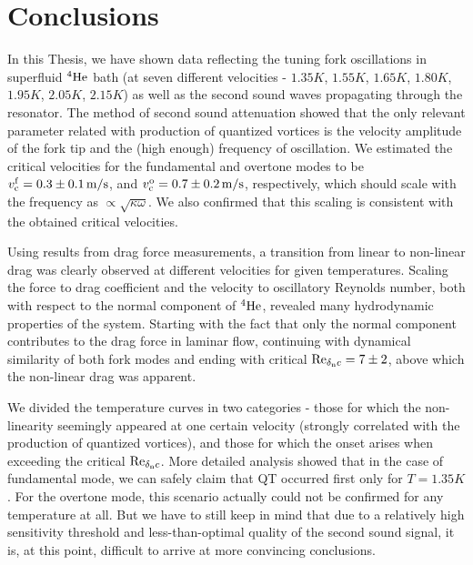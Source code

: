 \chapter{Conclusions}

In this Thesis, we have shown data reflecting the tuning fork oscillations in superfluid $ {}^4\mathrm{He} $ bath (at seven different velocities - $ 1.35\unit{K} $, $ 1.55\unit{K} $, $ 1.65\unit{K} $, $ 1.80\unit{K} $, $ 1.95\unit{K} $, $ 2.05\unit{K} $, $ 2.15\unit{K} $) as well as the second sound waves propagating through the resonator. The method of second sound attenuation showed that the only relevant parameter related with production of quantized vortices is the velocity amplitude of the fork tip and the (high enough) frequency of oscillation. We estimated the critical velocities for the fundamental and overtone modes to be $ v_{\mathrm{c}}^{\mathrm{f}} = 0.3 \pm 0.1 \,\mathrm{m/s}$, and $ v_{\mathrm{c}}^{\mathrm{o}} = 0.7 \pm 0.2 \,\mathrm{m/s} $, respectively, which should scale with the frequency as $ \propto \sqrt{\kappa\omega} $. We also confirmed that this scaling is consistent with the obtained critical velocities.

Using results from drag force measurements, a transition from linear to non-linear drag was clearly observed at different velocities for given temperatures. Scaling the force to drag coefficient and the velocity to oscillatory Reynolds number, both with respect to the normal component of $ {}^4\mathrm{He} $, revealed many hydrodynamic properties of the system. Starting with the fact that only the normal component contributes to the drag force in laminar flow, continuing with dynamical similarity of both fork modes and ending with critical $\text{Re}_{\delta_{\mathrm{n}}c}=7\pm 2 $, above which the non-linear drag was apparent.

We divided the temperature curves in two categories - those for which the non-linearity seemingly appeared at one certain velocity (strongly correlated with the production of quantized vortices), and those for which the onset arises when exceeding the critical $\text{Re}_{\delta_{\mathrm{n}}c}$. More detailed analysis showed that in the case of fundamental mode, we can safely claim that QT occurred first only for $ T = 1.35\unit{K} $. For the overtone mode, this scenario actually could not be confirmed for any temperature at all. But we have to still keep in mind that due to a relatively high sensitivity threshold and less-than-optimal quality of the second sound signal, it is, at this point, difficult to arrive at more convincing conclusions.

